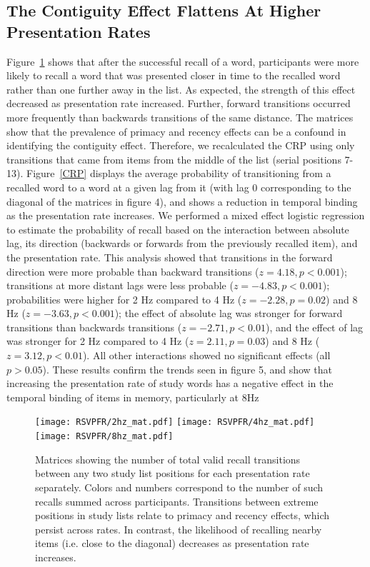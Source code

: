 \documentclass[10pt,letterpaper]{article}
\begin{document}
\subsection{The Contiguity Effect Flattens At Higher Presentation Rates}

Figure~\ref{uCRP} shows that after the successful recall of a word, participants were more likely to recall a word that was presented closer in time to the recalled word rather than one further away in the list. As expected, the strength of this effect decreased as presentation rate increased. Further, forward transitions occurred more frequently than backwards transitions of the same distance. The matrices show that the prevalence of primacy and recency effects can be a confound in identifying the contiguity effect. Therefore, we recalculated the CRP using only transitions that came from items from the middle of the list (serial positions 7-13). Figure~\ref{CRP} displays the average probability of transitioning from a recalled word to a word at a given lag from it (with lag 0 corresponding to the diagonal of the matrices in figure 4), and shows a reduction in temporal binding as the presentation rate increases. We performed a mixed effect logistic regression to estimate the probability of recall based on the interaction between absolute lag, its direction (backwards or forwards from the previously recalled item), and the presentation rate. This analysis showed that transitions in the forward direction were more probable than backward transitions ($z = 4.18, p<0.001$); transitions at more distant lags were less probable ($z=-4.83, p<0.001$); probabilities were higher for 2 Hz compared to 4 Hz ($z=-2.28, p=0.02$) and 8 Hz ($z=-3.63, p<0.001$); the effect of absolute lag was stronger for forward transitions than backwards transitions ($z=-2.71, p<0.01$), and the effect of lag was stronger for 2 Hz compared to 4 Hz ($z=2.11, p=0.03$) and 8 Hz ($z=3.12, p<0.01$). All other interactions showed no significant effects (all $p>0.05$). These results confirm the trends seen in figure 5, and show that increasing the presentation rate of study words has a negative effect in the temporal binding of items in memory, particularly at 8Hz

\begin{figure}
\texttt{[image: RSVPFR/2hz\_mat.pdf]}
\texttt{[image: RSVPFR/4hz\_mat.pdf]}
\texttt{[image: RSVPFR/8hz\_mat.pdf]}
\caption{Matrices showing the number of total valid recall transitions between any two study list positions for each presentation rate separately. Colors and numbers correspond to the number of such recalls summed across participants. Transitions between extreme positions in study lists relate to primacy and recency effects, which persist across rates. In contrast, the likelihood of recalling nearby items (i.e. close to the diagonal) decreases as presentation rate increases.} 
\label{uCRP}
\end{figure}
\end{document}
